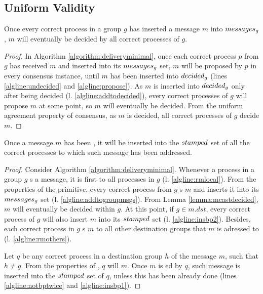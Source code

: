 \documentclass[times, 10pt]{article}
\begin{document}
\subsection{Uniform Validity}




\begin{lems} \label{lemma:mcastdecided}
Once every correct process in a group $g$ has inserted a message $m$ into $messages\text{$_g$}$, $m$ will eventually be decided by all correct processes of $g$.
\end{lems}

\begin{proof}
In Algorithm \ref{algorithm:deliveryminimal}, once each correct process $p$ from $g$ has received $m$ and inserted into its $messages\text{$_g$}$ set, $m$ will be proposed by $p$ in every consensus instance, until $m$ has been inserted into $decided\text{$_g$}$ (lines \ref{algline:undecided} and \ref{algline:propose}). As $m$ is inserted into $decided\text{$_g$}$ only after being decided (l. \ref{algline:addtodecided}), every correct processes of $g$ will propose $m$ at some point, so $m$ will eventually be decided. From the uniform agreement property of consensus, as $m$ is decided, all correct processes of $g$ decide $m$.
\end{proof}







\begin{lems} \label{lemma:mcastbarpending}
Once a message $m$ has been \amcast{}, it will be inserted into the $stamped$ set of all the correct processes to which such message has been addressed.
\end{lems}

\begin{proof}
Consider Algorithm \ref{algorithm:deliveryminimal}. Whenever a process in a group $g$ \amcast{}s a message, it is first \rmcast{} to all processes in $g$ (l. \ref{algline:rmlocal}). From the properties of the \rmcast{} primitive, every correct process from $g$ \rmdel{}s $m$ and inserts it into its $messages\text{$_g$}$ set (l. \ref{algline:addtogroupmsgs}). From Lemma \ref{lemma:mcastdecided}, $m$ will eventually be decided within $g$. At this point, if $g \in m.dst$, every correct process of $g$ will also insert $m$ into its $stamped$ set (l. \ref{algline:insbp2}). Besides, each correct process in $g$ \rmcast{}s $m$ to all other destination groups that $m$ is adressed to (l. \ref{algline:rmothers}).

Let $q$ be any correct process in a destination group $h$ of the message $m$, such that $h \neq g$. From the properties of \rmcast{}, $q$ will \rmdel{} $m$. Once $m$ is \rmdel{}ed by $q$, such message is inserted into the $stamped$ set of $q$, unless this has been already done (lines \ref{algline:notbptwice} and \ref{algline:insbp1}).
\end{proof}
\end{document}
